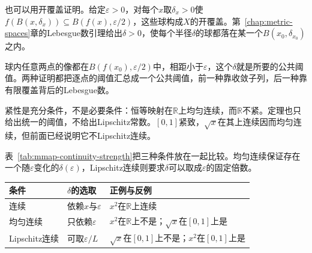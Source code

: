 也可以用开覆盖证明。给定$\varepsilon>0$，对每个$x$取$\delta_x>0$使$f(B(x,\delta_x))\subseteq B(f(x),\varepsilon/2)$，这些球构成$X$的开覆盖。第~\ref{chap:metric-spaces}章的Lebesgue数引理给出$\delta>0$，使每个半径$\delta$的球都落在某一个$B(x_0,\delta_{x_0})$之内。

球内任意两点的像都在$B(f(x_0),\varepsilon/2)$中，相距小于$\varepsilon$，这个$\delta$就是所要的公共阈值。两种证明都把逐点的阈值汇总成一个公共阈值，前一种靠收敛子列，后一种靠有限覆盖背后的Lebesgue数。

紧性是充分条件，不是必要条件：恒等映射在$\mathbb R$上均匀连续，而$\mathbb R$不紧。定理也只给出统一的阈值，不给出Lipschitz常数。$[0,1]$紧致，$\sqrt x$在其上连续因而均匀连续，但前面已经说明它不Lipschitz连续。

表~\ref{tab:mmap-continuity-strength}把三种条件放在一起比较。均匀连续保证存在一个随$\varepsilon$变化的$\delta(\varepsilon)$，Lipschitz连续则要求$\delta$可以取成$\varepsilon$的固定倍数。

\begin{BookInlineTable}
  \centering
  \caption{三种连续条件的强弱比较}
  \label{tab:mmap-continuity-strength}
  \begin{tabular}{lll}
    \toprule
    条件 & $\delta$的选取 & 正例与反例 \\
    \midrule
    连续 & 依赖$x$与$\varepsilon$ & $x^2$在$\mathbb R$上连续 \\
    均匀连续 & 只依赖$\varepsilon$ & $x^2$在$\mathbb R$上不是；$\sqrt x$在$[0,1]$上是 \\
    Lipschitz连续 & 可取$\varepsilon/L$ & $\sqrt x$在$[0,1]$上不是；$x^2$在$[0,1]$上是 \\
    \bottomrule
  \end{tabular}
\end{BookInlineTable}
